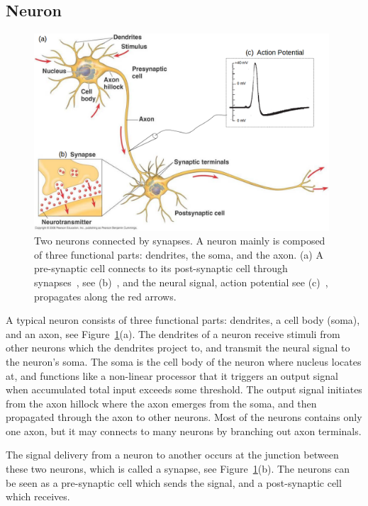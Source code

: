 \subsection{Neuron}
	\begin{figure}[bt]
	\centering
	\includegraphics[width=0.98\textwidth]{pics_snn/neuron2.png}
	\caption{Two neurons connected by synapses. 
		A neuron mainly is composed of three functional parts: dendrites, the soma, and the axon. (a) A pre-synaptic cell connects to its post-synaptic cell through synapses~\cite{reece2011campbell}, see (b)~\cite{reece2011campbell}, and the neural signal, action potential see (c)~\cite{hodgkin1939action}, propagates along the red arrows. }
	\label{Fig:neuron_basic}
\end{figure}

A typical neuron consists of three functional parts: dendrites, a cell body (soma), and an axon, see Figure~\ref{Fig:neuron_basic}(a).
The dendrites of a neuron receive stimuli from other neurons which the dendrites project to, and transmit the neural signal to the neuron's soma.
The soma is the cell body of the neuron where nucleus locates at, and functions like a non-linear processor that it triggers an output signal when accumulated total input exceeds some threshold.
The output signal initiates from the axon hillock where the axon emerges from the soma, and then propagated through the axon to other neurons.
Most of the neurons contains only one axon, but it may connects to many neurons by branching out axon terminals. 


The signal delivery from a neuron to another occurs at the junction between these two neurons, which is called a synapse, see Figure~\ref{Fig:neuron_basic}(b).
The neurons can be seen as a pre-synaptic cell which sends the signal, and a post-synaptic cell which receives.

